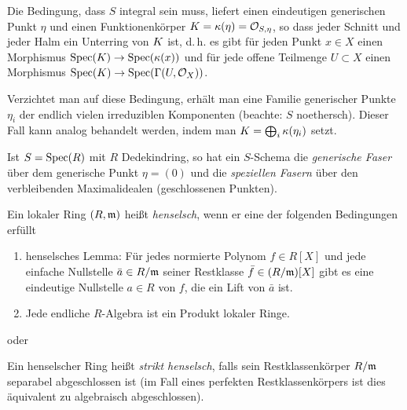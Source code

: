 \documentclass[german]{scrreprt}
\begin{document}
\begin{Definition}[Dedekindring]
  \begin{Bemerkung}
    Die Bedingung, dass $S$ integral sein muss, liefert einen eindeutigen
    generischen Punkt $\eta$ und einen Funktionenkörper
    $K=\kappa(\eta)=\mathcal{O}_{S,\eta}$, so dass jeder Schnitt und jeder Halm ein
    Unterring von $K$ ist, d.\,h. es gibt für jeden Punkt $x\in X$ einen
    Morphismus $\operatorname{Spec}(K)\to\operatorname{Spec}(\kappa(x))$ und für jede offene Teilmenge
    $U\subset X$ einen Morphismus $\operatorname{Spec}(K)\to\operatorname{Spec}(\Gamma(U,\mathcal{O}_X))$.

    Verzichtet man auf diese Bedingung, erhält man eine Familie
    generischer Punkte $\eta_i$ der endlich vielen irreduziblen
    Komponenten (beachte: $S$ noethersch). Dieser Fall kann analog
    behandelt werden, indem man $K=\bigoplus_i \kappa(\eta_i)$ setzt.
  \end{Bemerkung}

  \begin{Bemerkung}
    Ist $S=\operatorname{Spec}(R)$ mit $R$ Dedekindring, so hat ein $S$-Schema die
    \emph{generische Faser} über dem generische Punkt $\eta=(0)$ und die
    \emph{speziellen Fasern} über den verbleibenden Maximalidealen
    (geschlossenen Punkten).
  \end{Bemerkung}
\end{Definition}


\begin{Definition}\label{def:henselscheringe}
  Ein lokaler Ring $(R,\mathfrak{m})$ heißt \emph{henselsch}, wenn
  er eine der folgenden Bedingungen erfüllt
  \begin{enumerate}[label=(\roman*)]
  \item henselsches Lemma:
    Für jedes normierte Polynom $f\in R[X]$ und jede einfache Nullstelle
    $\bar a\in R/\mathfrak{m}$ seiner Restklasse $\bar f\in (R/\mathfrak{m})[X]$
    gibt es eine eindeutige Nullstelle $a\in R$ von $f$, die ein Lift
    von $\bar a$ ist.
  \item Jede endliche $R$-Algebra ist ein Produkt lokaler Ringe.
  \end{enumerate}
  \cite[2.3, Proposition 4]{neron}
  oder \cite[vgl.][Chapter IV.6]{silverman2}
  
  Ein henselscher Ring heißt \emph{strikt henselsch}, falls sein
  Restklassenkörper $R/\mathfrak{m}$ separabel abgeschlossen ist
  (im Fall eines perfekten Restklassenkörpers ist dies äquivalent zu
  algebraisch abgeschlossen).
\end{Definition}
\end{document}
